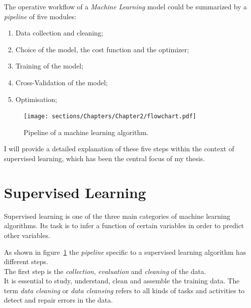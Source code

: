 The operative workflow of a \textit{Machine Learning} model could be summarized by a \textit{pipeline} of five modules:

\begin{enumerate}

\item Data collection and cleaning;
\item Choice of the model, the cost function and the optimizer;
\item Training of the model;
\item Cross-Validation of the model;
\item Optimisation;

\end{enumerate}

\begin{figure}[h]
\centering
\texttt{[image: sections/Chapters/Chapter2/flowchart.pdf]}
\caption{Pipeline of a machine learning algorithm.}
\label{fig:pipeline}
\end{figure}

I will provide a detailed explanation of these five steps within the context of supervised learning, which has been the central focus of my thesis.

\section{Supervised Learning}

Supervised learning is one of the three main categories of machine learning algorithms.
Its task is to infer a function of certain variables in order to predict other variables.

As shown in figure~\ref{fig:pipeline} the \textit{pipeline} specific to a supervised learning algorithm has different steps.\\

The first step is the \textit{collection}, \textit{evaluation} and \textit{cleaning} of the data.\\
It is essential to study, understand, clean and assemble the training data.
The term \textit{data cleaning} or \textit{data cleansing} refers to all kinds of tasks and activities to detect and repair errors in the data.\\

